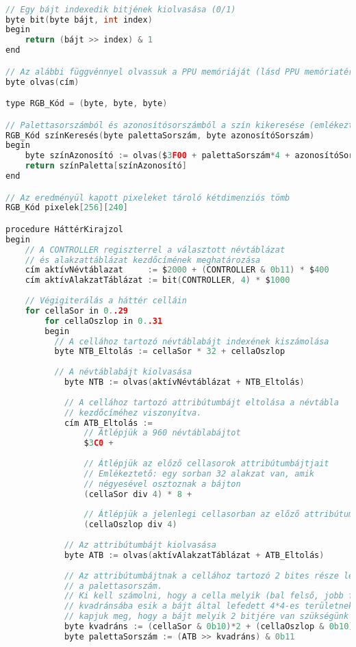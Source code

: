 \begin{lstlisting}[backgroundcolor = \color{white}, language=c, basicstyle=\scriptsize]

// Egy bájt indexedik bitjének kiolvasása (0/1)
byte bit(byte bájt, int index)
begin
	return (bájt >> index) & 1
end

// Az alábbi függvénnyel olvassuk a PPU memóriáját (lásd PPU memóriatérkép)
byte olvas(cím)

type RGB_Kód = (byte, byte, byte)

// Palettasorszámból és azonosítósorszámból a szín kikeresése (emlékeztető: $3F00 a paletta index kezdőcíme)
RGB_Kód színKeresés(byte palettaSorszám, byte azonosítóSorszám)
begin
	byte színAzonosító := olvas($3F00 + palettaSorszám*4 + azonosítóSorszám)
	return színPaletta[színAzonosító]
end

// Az eredményül kapott pixeleket tároló kétdimenziós tömb
RGB_Kód pixelek[256][240]

procedure HáttérKirajzol
begin
	// A CONTROLLER regiszterrel a választott névtáblázat
	// és alakzattáblázat kezdőcímének meghatározása
	cím aktívNévtáblazat     := $2000 + (CONTROLLER & 0b11) * $400
	cím aktívAlakzatTáblázat := bit(CONTROLLER, 4) * $1000
	
	// Végigiterálás a háttér celláin
	for cellaSor in 0..29
		for cellaOszlop in 0..31
		begin
		  // A cellához tartozó névtáblabájt indexének kiszámolása
		  byte NTB_Eltolás := cellaSor * 32 + cellaOszlop 
		  
		  // A névtáblabájt kiolvasása
			byte NTB := olvas(aktívNévtáblázat + NTB_Eltolás)
			
			// A cellához tartozó attribútumbájt eltolása a névtábla
			// kezdőcíméhez viszonyítva.
			cím ATB_Eltolás := 
				// Átlépjük a 960 névtáblabájtot 
				$3C0 +		
								
				// Átlépjük az előző cellasorok attribútumbájtjait
				// Emlékeztető: egy sorban 32 alakzat van, amik 
				// négyesével osztoznak a bájton
				(cellaSor div 4) * 8 + 	
					
				// Átlépjük a jelenlegi cellasorban az előző attribútumbájtokat
				(cellaOszlop div 4)         
				
			// Az attribútumbájt kiolvasása
			byte ATB := olvas(aktívAlakzatTáblázat + ATB_Eltolás)
			
			// Az attribútumbájtnak a cellához tartozó 2 bites része lesz
			// a palettasorszám.
			// Ki kell számolni, hogy a cella melyik (bal felső, jobb felső, stb.)
			// kvadránsába esik a bájt által lefedett 4*4-es területnek, ugyanis így
			// kapjuk meg, hogy a bájt melyik 2 bitjére van szükségünk
			byte kvadráns := (cellaSor & 0b10)*2 + (cellaOszlop & 0b10) 
			byte palettaSorszám := (ATB >> kvadráns) & 0b11
				

\end{lstlisting}
